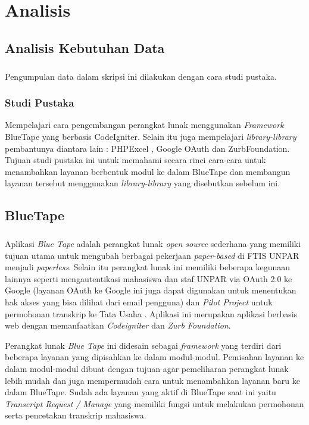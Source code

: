 \chapter{Analisis}
\label{chap:analisis}
\setcounter{secnumdepth}{3}

\section{Analisis Kebutuhan Data}
\paragraph{} Pengumpulan data dalam skripsi ini dilakukan dengan cara studi pustaka.
\subsection{Studi Pustaka}
Mempelajari cara pengembangan perangkat lunak menggunakan \textit{Framework} BlueTape yang berbasis CodeIgniter. Selain itu juga mempelajari \textit{library-library} pembantunya diantara lain : PHPExcel , Google OAuth dan ZurbFoundation. Tujuan studi pustaka ini untuk memahami secara rinci cara-cara untuk menambahkan layanan berbentuk modul ke dalam BlueTape dan membangun layanan tersebut menggunakan \textit{library-library} yang disebutkan sebelum ini.

\section{BlueTape}
\paragraph{} Aplikasi \textit{Blue Tape} adalah perangkat lunak \textit{open source} sederhana yang memiliki tujuan utama untuk mengubah berbagai pekerjaan \textit{paper-based} di FTIS UNPAR menjadi \textit{paperless}. Selain itu perangkat lunak ini memiliki beberapa kegunaan lainnya seperti mengautentikasi mahasiswa dan staf UNPAR via OAuth 2.0 ke Google (layanan OAuth ke Google ini juga dapat digunakan untuk menentukan hak akses yang bisa dilihat dari email pengguna) dan \textit{Pilot Project} untuk permohonan transkrip ke Tata Usaha . Aplikasi ini merupakan aplikasi berbasis web dengan memanfaatkan \textit{Codeigniter} dan \textit{Zurb Foundation}. 

Perangkat lunak \textit{Blue Tape} ini didesain sebagai \textit{framework} yang terdiri dari beberapa layanan yang dipisahkan ke dalam modul-modul. Pemisahan layanan ke dalam modul-modul dibuat dengan tujuan agar pemeliharan perangkat lunak lebih mudah dan juga mempermudah cara untuk menambahkan layanan baru ke dalam BlueTape. Sudah ada layanan yang aktif di BlueTape saat ini yaitu \textit{Transcript Request / Manage} yang memiliki fungsi untuk melakukan permohonan serta pencetakan transkrip mahasiswa.

